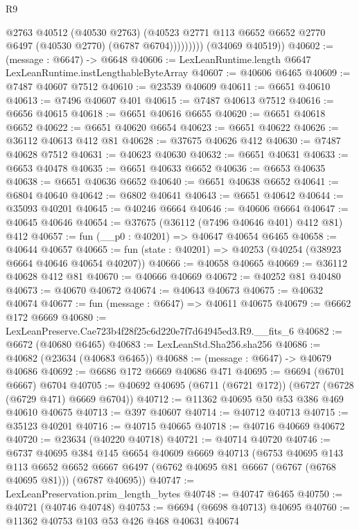 \begin{lexlean}{R9}
\begin{coremodule}
                    @2763
                    @40512
                    (@40530 @2763)
                    (@40523 @2771 @113 @6652 @6652 @2770 @6497 (@40530 @2770) (@6787 @6704)))))))))
      (@34069 @40519))
@40602 := (message : @6647) -> @6648
@40606 := LexLeanRuntime.length @6647 LexLeanRuntime.instLengthableByteArray
@40607 := @40606 @6465
@40609 := @7487 @40607 @7512
@40610 := @23539 @40609
@40611 := @6651 @40610
@40613 := @7496 @40607 @401
@40615 := @7487 @40613 @7512
@40616 := @6656 @40615
@40618 := @6651 @40616 @6655
@40620 := @6651 @40618 @6652
@40622 := @6651 @40620 @6654
@40623 := @6651 @40622
@40626 := @36112 @40613 @412 @81
@40628 := @37675 @40626 @412
@40630 := @7487 @40628 @7512
@40631 := @40623 @40630
@40632 := @6651 @40631
@40633 := @6653 @40478
@40635 := @6651 @40633 @6652
@40636 := @6653 @40635
@40638 := @6651 @40636 @6652
@40640 := @6651 @40638 @6652
@40641 := @6804 @40640
@40642 := @6802 @40641
@40643 := @6651 @40642
@40644 := @35093 @40201
@40645 := @40246 @6664
@40646 := @40606 @6664
@40647 := @40645 @40646
@40654 := @37675 (@36112 (@7496 @40646 @401) @412 @81) @412
@40657 := fun (__p0 : @40201) => @40647 @40654 @6465
@40658 := @40644 @40657
@40665 := fun (state : @40201) => @40253 (@40254 (@38923 @6664 @40646 @40654 @40207))
@40666 := @40658 @40665
@40669 := @36112 @40628 @412 @81
@40670 := @40666 @40669
@40672 := @40252 @81 @40480
@40673 := @40670 @40672
@40674 := @40643 @40673
@40675 := @40632 @40674
@40677 := fun (message : @6647) => @40611 @40675
@40679 := @6662 @172 @6669
@40680 := LexLeanPreserve.Cae723b4f28f25c6d220e7f7d64945ed3.R9.__fits_6
@40682 := @6672 (@40680 @6465)
@40683 := LexLeanStd.Sha256.sha256
@40686 := @40682 (@23634 (@40683 @6465))
@40688 := (message : @6647) -> @40679 @40686
@40692 := @6686 @172 @6669 @40686 @471
@40695 := @6694 (@6701 @6667) @6704
@40705 := @40692 @40695 (@6711 (@6721 @172)) (@6727 (@6728 (@6729 @471) @6669 @6704))
@40712 := @11362 @40695 @50 @53 @386 @469 @40610 @40675
@40713 := @397 @40607
@40714 := @40712 @40713
@40715 := @35123 @40201
@40716 := @40715 @40665
@40718 := @40716 @40669 @40672
@40720 := @23634 (@40220 @40718)
@40721 := @40714 @40720
@40746 := @6737
    @40695
    @384
    @145
    @6654
    @40609
    @6669
    @40713
    (@6753
      @40695
      @143
      @113
      @6652
      @6652
      @6667
      @6497
      (@6762 @40695 @81 @6667 (@6767 (@6768 @40695 @81)))
      (@6787 @40695))
@40747 := LexLeanPreservation.prim_length_bytes
@40748 := @40747 @6465
@40750 := @40721 (@40746 @40748)
@40753 := @6694 (@6698 @40713) @40695
@40760 := @11362 @40753 @103 @53 @426 @468 @40631 @40674

\end{coremodule}
\end{lexlean}
